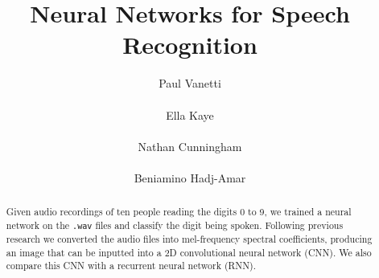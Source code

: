 \documentclass{article} %
\title{Neural Networks for Speech Recognition}
\author{
Paul Vanetti \\
\texttt{} \\
\And
Ella Kaye \\
\texttt{} \\
\And
Nathan Cunningham \\
\texttt{} \\
\And
Beniamino Hadj-Amar \\
\texttt{}
}
\begin{document}
\maketitle


\begin{abstract}
Given audio recordings of ten people reading the digits 0 to 9, we trained a neural network on the \texttt{.wav} files and classify the digit being spoken. Following previous research we  converted the audio files into mel-frequency spectral coefficients, producing an image that can be inputted into a 2D convolutional neural network (CNN). We also compare this CNN with a recurrent neural network (RNN).
\end{abstract}













\end{document}
